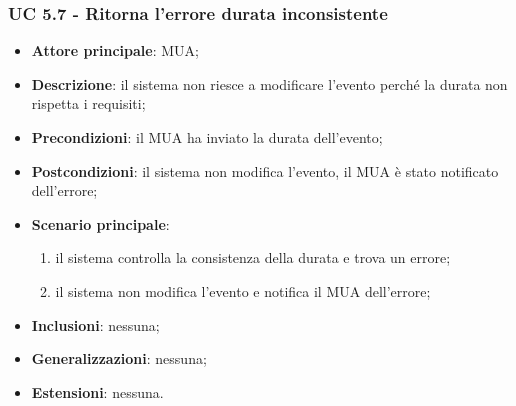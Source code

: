     \subsubsection{UC 5.7 - Ritorna l'errore durata inconsistente} \label{sec:UC5.7}
    \begin{itemize}
        \item \textbf{Attore principale}: MUA;
        \item \textbf{Descrizione}: il sistema non riesce a modificare l'evento perché la durata non rispetta i requisiti;
        \item \textbf{Precondizioni}: il MUA ha inviato la durata dell'evento;
        \item \textbf{Postcondizioni}: il sistema non modifica l'evento, il MUA è stato notificato dell'errore;
        \item \textbf{Scenario principale}:
            \begin{enumerate}
                \item il sistema controlla la consistenza della durata e trova un errore;
                \item il sistema non modifica l'evento e notifica il MUA dell'errore;
            \end{enumerate}
        \item \textbf{Inclusioni}: nessuna;
        \item \textbf{Generalizzazioni}: nessuna;
        \item \textbf{Estensioni}: nessuna.
    \end{itemize}